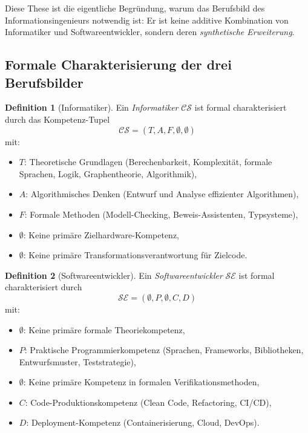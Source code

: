 ﻿\documentclass[a4paper,12pt]{report}
\theoremstyle{definition}
\newtheorem{definition}{Definition}[section]
\begin{document}
Diese These ist die eigentliche Begründung, warum das Berufsbild des
Informationsingenieurs notwendig ist: Er ist keine additive Kombination von
Informatiker und Softwareentwickler, sondern deren \emph{synthetische Erweiterung}.

\subsection{Formale Charakterisierung der drei Berufsbilder}

\begin{definition}[Informatiker]
\label{def:informatiker}
Ein \emph{Informatiker} $\mathcal{CS}$ ist formal charakterisiert durch das Kompetenz-Tupel
\[
  \mathcal{CS} = (T, A, F, \emptyset, \emptyset)
\]
mit:
\begin{itemize}
  \item $T$: Theoretische Grundlagen (Berechenbarkeit, Komplexität, formale Sprachen,
        Logik, Graphentheorie, Algorithmik),
  \item $A$: Algorithmisches Denken (Entwurf und Analyse effizienter Algorithmen),
  \item $F$: Formale Methoden (Modell-Checking, Beweis-Assistenten, Typsysteme),
  \item $\emptyset$: Keine primäre Zielhardware-Kompetenz,
  \item $\emptyset$: Keine primäre Transformationsverantwortung für Zielcode.
\end{itemize}
\end{definition}

\begin{definition}[Softwareentwickler]
\label{def:swentw}
Ein \emph{Softwareentwickler} $\mathcal{SE}$ ist formal charakterisiert durch
\[
  \mathcal{SE} = (\emptyset, P, \emptyset, C, D)
\]
mit:
\begin{itemize}
  \item $\emptyset$: Keine primäre formale Theoriekompetenz,
  \item $P$: Praktische Programmierkompetenz (Sprachen, Frameworks, Bibliotheken,
        Entwurfsmuster, Teststrategie),
  \item $\emptyset$: Keine primäre Kompetenz in formalen Verifikationsmethoden,
  \item $C$: Code-Produktionskompetenz (Clean Code, Refactoring, CI/CD),
  \item $D$: Deployment-Kompetenz (Containerisierung, Cloud, DevOps).
\end{itemize}
\end{definition}
\end{document}
